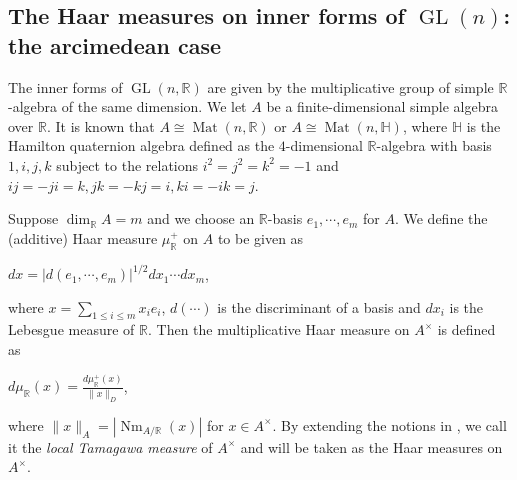 \documentclass[11pt]{article}
\theoremstyle{plain}
\theoremstyle{remark}
\theoremstyle{definition}
\DeclareMathOperator{\Nm}{Nm}
\DeclareMathOperator{\GL}{GL}
\DeclareMathOperator{\Mt}{Mat}
\begin{document}
\subsection{The Haar measures on inner forms of $\GL(n)$: the arcimedean case}\label{ssHaarR}

The inner forms of $\GL(n,\mathbb{R})$ are given by the multiplicative group of simple $\mathbb{R}$-algebra of the same dimension. 
We let $A$ be a finite-dimensional simple algebra over $\mathbb{R}$. 
It is known that $A\cong \Mt(n,\mathbb{R})$ or $A\cong \Mt(n,\mathbb{H})$, where $\mathbb{H}$ is the Hamilton quaternion algebra defined as the $4$-dimensional $\mathbb{R}$-algebra with basis $1,i,j,k$ subject to the relations $i^2=j^2=k^2=-1$ and $ij=-ji=k,jk=-kj=i,ki=-ik=j$. 

Suppose $\dim_{\mathbb{R}}A=m$ and we choose an $\mathbb{R}$-basis $e_1,\cdots,e_m$ for $A$. 
We define the (additive) Haar measure $\mu_{\mathbb{R}}^{+}$ on $A$ to be given as
\begin{center}
    $d x=|d(e_1,\cdots,e_m)|^{1/2}d x_1\cdots d x_m$,
\end{center}
where $x=\sum_{1\leq i\leq m}x_i e_i$, $d(\cdots)$ is the discriminant of a basis and $d x_i$ is the Lebesgue measure of $\mathbb{R}$.  %
Then the multiplicative Haar measure on $A^{\times}$ is defined as
\begin{center}
    $d \mu_{\mathbb{R}}(x)=\frac{d \mu_{\mathbb{R}}^{+}(x)}{\|x\|_{D}}$,
\end{center}
where $\|x\|_{A}=|\Nm_{A/\mathbb{R}}(x)|$ for $x\in A^{\times}$.  
By extending the notions in \cite[\S 7.5]{McRd219}, 
we call it the {\it local Tamagawa measure} of $A^{\times}$ and will be taken as the Haar measures on $A^{\times}$. 
\end{document}
